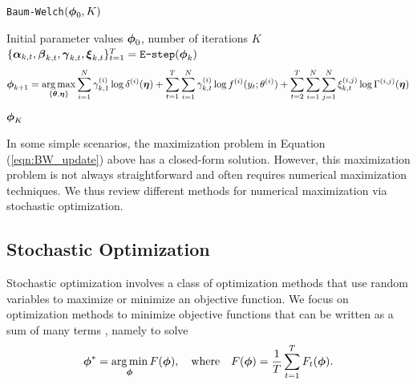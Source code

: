 %
%
%
\begin{algorithm}
\caption{\texttt{Baum-Welch}$(\boldsymbol{\phi}_0,K)$}\label{alg:EM}
\begin{algorithmic}[1]
\Require Initial parameter values $\boldsymbol{\phi}_0$, number of iterations $K$
    \State $\{\boldsymbol{\alpha}_{k,t},\boldsymbol{\beta}_{k,t},\boldsymbol{\gamma}_{k,t},\boldsymbol{\xi}_{k,t}\}_{t=1}^T = \texttt{E-step}(\boldsymbol{\phi}_{k})$  
    \State {} \small $$\boldsymbol{\phi}_{k+1} = \operatorname*{arg\,max}_{\{\boldsymbol{\theta},\boldsymbol{\eta}\}} \sum_{i=1}^N \gamma^{(i)}_{k,1} \log \delta^{(i)}(\boldsymbol{\eta}) + \sum_{t = 1}^T \sum_{i=1}^N \gamma^{(i)}_{k,t} \log f^{(i)}(y_t;\theta^{(i)}) + \sum_{t=2}^{T} \sum_{i=1}^N \sum_{j=1}^N \xi_{k,t}^{(i,j)} \log \Gamma^{(i,j)}(\boldsymbol{\eta})$$ \normalsize
\EndFor
\State \Return $\boldsymbol{\phi}_K$
\end{algorithmic}
\end{algorithm}
%
In some simple scenarios, the maximization problem in Equation (\ref{eqn:BW_update}) above has a closed-form solution. %
However, this maximization problem is not always straightforward and often requires numerical maximization techniques. %
We thus review different methods for numerical maximization via stochastic optimization. %

\subsection{Stochastic Optimization}
\label{subsec:stoch_optim}

Stochastic optimization involves a class of optimization methods that use random variables to maximize or minimize an objective function. We focus on optimization methods to minimize objective functions that can be written as a sum of many terms \citep{Robbins:1951}, %
namely to solve
%
\begin{equation}
    \boldsymbol{\phi}^* = \operatorname*{arg\,min}_{\boldsymbol{\phi}} F(\boldsymbol{\phi}), \quad \text{where} \quad F(\boldsymbol{\phi}) = \frac{1}{T}\sum_{t = 1}^T F_t(\boldsymbol{\phi}).
    \label{eqn:stoch_opt}
\end{equation}
%

